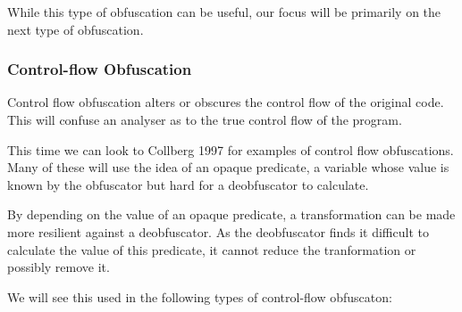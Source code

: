 \documentclass{report}
\begin{document}
While this type of obfuscation can be useful, our focus will be primarily on the next type of obfuscation.

\subsubsection{Control-flow Obfuscation}

Control flow obfuscation alters or obscures the control flow of the original code. This will confuse an analyser as to the
true control flow of the program.

This time we can look to Collberg 1997 \cite{taxobftrans} for examples of control flow obfuscations. Many of these will use the idea
of an opaque predicate, a variable whose value is known by the obfuscator but hard for a deobfuscator to calculate.

By depending on the value of an opaque predicate, a transformation can be made more resilient against a deobfuscator. As the
deobfuscator finds it difficult to calculate the value of this predicate, it cannot reduce the tranformation or possibly
remove it.

We will see this used in the following types of control-flow obfuscaton:
\end{document}
